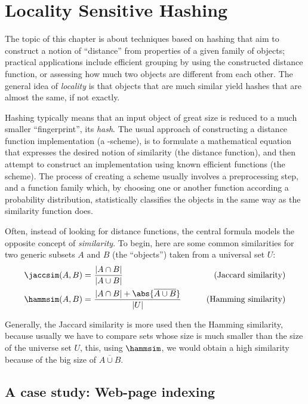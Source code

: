 \chapter{Locality Sensitive Hashing}

The topic of this chapter is about techniques based on hashing that aim to construct a notion of ``distance'' from properties of a given family of objects; practical applications include efficient grouping by using the constructed distance function, or assessing how much two objects are different from each other. The general idea of \emph{locality} is that objects that are much similar yield hashes that are almost the same, if not exactly.

Hashing typically means that an input object of great size is reduced to a much smaller ``fingerprint'', its \emph{hash}. The usual approach of constructing a distance function implementation (a \lsh-scheme), is to formulate a mathematical equation that expresses the desired notion of similarity (the distance function), and then attempt to construct an implementation using known efficient functions (the scheme). The process of creating a scheme usually involves a preprocessing step, and a function family which, by choosing one or another function according a probability distribution, statistically classifies the objects in the same way as the similarity function does.

Often, instead of looking for distance functions, the central formula models the opposite concept of \emph{similarity}. To begin, here are some common similarities for two generic subsets $A$ and $B$ (the ``objects'') taken from a universal set $U$:
\begin{align*}
    \jaccsim(A, B) =&\ \frac{|A \cap B|}{|A \cup B|}                      & \tag{Jaccard similarity} \\
    \hammsim(A, B) =&\ \frac{|A \cap B| + \abs{\overline{A \cup B}}}{|U|} & \tag{Hamming similarity}
\end{align*}

\begin{observation}
    Generally, the Jaccard similarity is more used then the Hamming similarity, because usually we have to compare sets whose size is much smaller than the size of the universe set $U$, this, using $\hammsim$, we would obtain a high similarity because of the big size of $\overline{A\cup B}$.
\end{observation}


\section{A case study: Web-page indexing}\label{sec:web-page-indexing}


